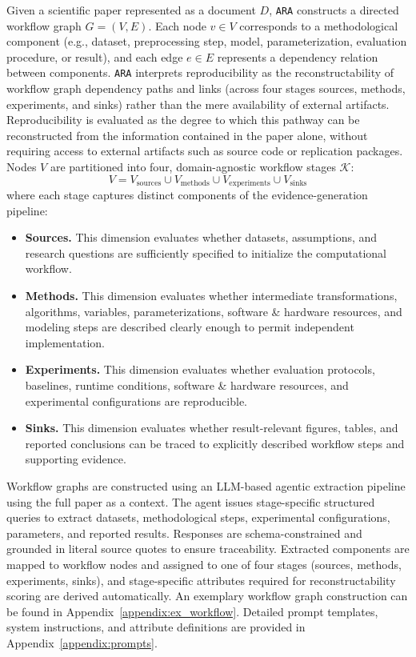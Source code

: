 \documentclass{article}
\begin{document}
Given a scientific paper represented as a document $D$, \texttt{ARA} constructs a directed workflow graph $G = (V, E)$.
Each node $v\in V$ corresponds to a methodological component (e.g., dataset, preprocessing step, model, parameterization, evaluation procedure, or result), and each edge $e\in E$ represents a dependency relation between components.
%
\texttt{ARA} interprets reproducibility as the reconstructability of workflow graph dependency paths and links (across four stages sources, methods, experiments, and sinks) rather than the mere availability of external artifacts.
%
Reproducibility is evaluated as the degree to which this pathway can be reconstructed from the information contained in the paper alone, without requiring access to external artifacts such as source code or replication packages.
Nodes $V$ are partitioned into four, domain-agnostic workflow stages $\mathcal{K}$: 
\begin{equation}
    V = V_{\text{sources}} \cup V_{\text{methods}} \cup V_{\text{experiments}} \cup V_{\text{sinks}}
\end{equation}
where each stage captures distinct components of the evidence-generation pipeline:
\begin{itemize}
    \item \textbf{Sources.}
    This dimension evaluates whether datasets, assumptions, and research questions are sufficiently specified to initialize the computational workflow.
    \item \textbf{Methods.}
    This dimension evaluates whether intermediate transformations, algorithms, variables, parameterizations, software \& hardware resources, and modeling steps are described clearly enough to permit independent implementation.
    \item \textbf{Experiments.}
    This dimension evaluates whether evaluation protocols, baselines, runtime conditions, software \& hardware resources, and experimental configurations are reproducible.
    \item \textbf{Sinks.}
    This dimension evaluates whether result-relevant figures, tables, and reported conclusions can be traced to explicitly described workflow steps and supporting evidence.
\end{itemize}

Workflow graphs are constructed using an LLM-based agentic extraction pipeline using the full paper as a context. 
The agent issues stage-specific structured queries to extract datasets, methodological steps, experimental configurations, parameters, and reported results. 
Responses are schema-constrained and grounded in literal source quotes to ensure traceability. 
Extracted components are mapped to workflow nodes and assigned to one of four stages (sources, methods, experiments, sinks), and stage-specific attributes required for reconstructability scoring are derived automatically. 
An exemplary workflow graph construction can be found in Appendix~\ref{appendix:ex_workflow}.
Detailed prompt templates, system instructions, and attribute definitions are provided in Appendix~\ref{appendix:prompts}.
\end{document}
